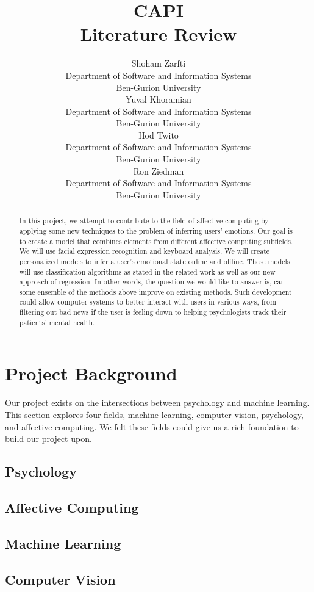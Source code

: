 \documentclass{article}
\title{CAPI \\ Literature Review}
\author{
  Shoham Zarfti \\
  Department of Software and Information Systems \\
  Ben-Gurion University \\
   \And
 Yuval Khoramian \\
  Department of Software and Information Systems\\
  Ben-Gurion University \\
  \And
 Hod Twito \\
  Department of Software and Information Systems\\
  Ben-Gurion University \\
  \And
 Ron Ziedman \\
  Department of Software and Information Systems\\
  Ben-Gurion University \\
}
\begin{document}
\maketitle
\begin{abstract}
  In this project, we attempt to contribute to the field of affective computing by applying some new techniques to the problem of inferring users'
  emotions. Our goal is to create a model that combines elements from different affective computing subfields.
  We will use facial expression recognition and keyboard analysis. We will create personalized models to infer a user's emotional state online
  and offline. These models will use classification algorithms as stated in the related work as well as our new approach of regression. In other words,
  the question we would like to answer is, can some ensemble of the methods above improve on existing methods. Such development could allow computer
  systems to better interact with users in various ways, from filtering out bad news if the user is feeling down to helping psychologists track their
  patients' mental health.
\end{abstract}


\section{Project Background}
Our project exists on the intersections between psychology and machine learning.
This section explores four fields, machine learning, computer vision, psychology, and affective computing.
We felt these fields could give us a rich foundation to build our project upon.


\subsection{Psychology}


\subsection{Affective Computing}


\subsection{Machine Learning}


\subsection{Computer Vision}  \label{section:cv}

\end{document}
